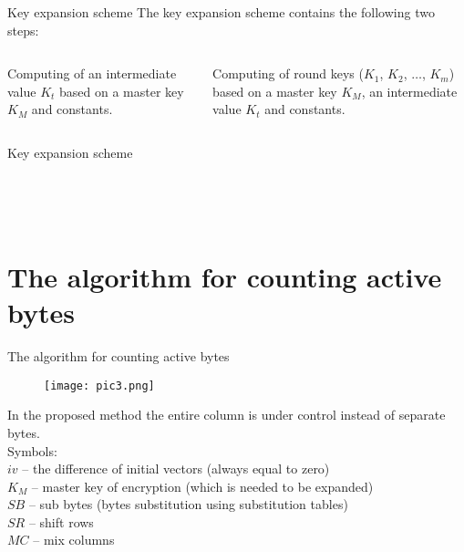 \documentclass[10pt]{beamer}
\begin{document}
\begin{frame}{Key expansion scheme}
The key expansion scheme contains the following two steps:
\begin{columns}
\begin{column}{0.5\textwidth}
Computing of an intermediate value $K_t$ based on a master key $K_M$ and constants.
\end{column}
\begin{column}{0.5\textwidth}
Computing of round keys ($K_1$, $K_2$, $\dots$, $K_m$) based on a master key $K_M$, an intermediate value $K_t$ and constants.
\end{column}
\end{columns}
\end{frame}

\begin{frame}{Key expansion scheme}
\begin{figure}[h]
\begin{minipage}[h]{0.49\linewidth}
\\
\end{minipage}
\hfill
\begin{minipage}[h]{0.49\linewidth}
\\
\end{minipage}
\end{figure}
\end{frame}

\section{The algorithm for counting active bytes}

\begin{frame}{The algorithm for counting active bytes}
\begin{wrapfigure}{l}{0.6\linewidth}
\texttt{[image: pic3.png]}
\\
\end{wrapfigure}
In the proposed method the entire column is under control instead of separate bytes. \\
Symbols: \\
$iv$ – the difference of initial vectors (always equal to zero) \\
$K_M$ – master key of encryption (which is needed to be expanded) \\
$SB$ – sub bytes (bytes substitution using substitution tables) \\
$SR$ –  shift rows \\
$MC$ – mix columns
\end{frame}
\end{document}
